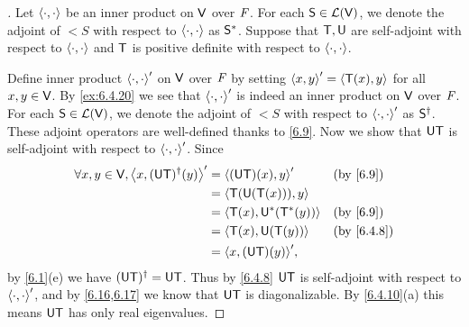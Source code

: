 \begin{proof}[]
	Let \(\left\langle\cdot, \cdot\right\rangle\) be an inner product on \(\mathsf{V}\) over \(\mathit{F}\).
	For each \(\mathsf{S} \in \mathcal{L}(\mathsf{V})\), we denote the adjoint of \(\lt{S}\) with respect to \(\left\langle\cdot, \cdot\right\rangle\) as \(\mathsf{S}^*\).
	Suppose that \(\mathsf{T}, \mathsf{U}\) are self-adjoint with respect to \(\left\langle\cdot, \cdot\right\rangle\) and \(\mathsf{T}\) is positive definite with respect to \(\left\langle\cdot, \cdot\right\rangle\).

	Define inner product \(\left\langle\cdot, \cdot\right\rangle'\) on \(\mathsf{V}\) over \(\mathit{F}\) by setting \(\left\langle x, y\right\rangle' = \left\langle\mathsf{T}(x), y\right\rangle\) for all \(x, y \in \mathsf{V}\).
	By \cref{ex:6.4.20} we see that \(\left\langle\cdot, \cdot\right\rangle'\) is indeed an inner product on \(\mathsf{V}\) over \(\mathit{F}\).
	For each \(\mathsf{S} \in \mathcal{L}(\mathsf{V})\), we denote the adjoint of \(\lt{S}\) with respect to \(\left\langle\cdot, \cdot\right\rangle'\) as \(\mathsf{S}^{\dag}\).
	These adjoint operators are well-defined thanks to \cref{6.9}.
	Now we show that \(\mathsf{U} \mathsf{T}\) is self-adjoint with respect to \(\left\langle\cdot, \cdot\right\rangle'\).
	Since
	\begin{align*}
		\forall x, y \in \V, \inn{x, (\U \T)^{\dag}(y)}' & = \inn{(\U \T)(x), y}'       &  & \by{6.9}   \\
		                                                 & = \inn{\T(\U(\T(x))), y}                     \\
		                                                 & = \inn{\T(x), \U^*(\T^*(y))} &  & \by{6.9}   \\
		                                                 & = \inn{\T(x), \U(\T(y))}     &  & \by{6.4.8} \\
		                                                 & = \inn{x, (\U \T)(y)}',
	\end{align*}
	by \cref{6.1}(e) we have \((\mathsf{U} \mathsf{T})^{\dag} = \mathsf{U} \mathsf{T}\).
	Thus by \cref{6.4.8} \(\mathsf{U} \mathsf{T}\) is self-adjoint with respect to \(\left\langle\cdot, \cdot\right\rangle'\), and by \cref{6.16,6.17} we know that \(\mathsf{U} \mathsf{T}\) is diagonalizable.
	By \cref{6.4.10}(a) this means \(\mathsf{U} \mathsf{T}\) has only real eigenvalues.


\end{proof}
